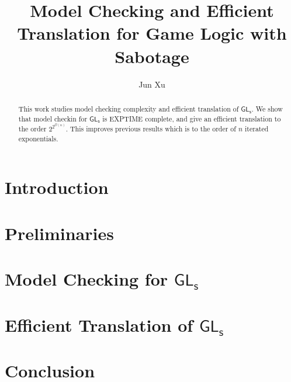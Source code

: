 \documentclass[a4paper,UKenglish,cleveref, autoref, thm-restate]{lipics-v2021}
\title{Model Checking and Efficient Translation for Game Logic with Sabotage} %
\author{Jun {Xu}}{Nanyang Technological University, Singapore}{willxujun@hotmail.com}{https://orcid.org/0000-0002-1825-0097}{This author is supported by an NRF Research Grant}
\newcommand{\GLs}{$\mathsf{GL_s}$}
\begin{document}
\maketitle

\begin{abstract}
This work studies model checking complexity and efficient translation of \GLs{}.
We show that model checkin for \GLs{} is EXPTIME complete,
and give an efficient translation to the order $2^{2^{\mathcal O (n)}}$.
This improves previous results which is to the order of $n$ iterated exponentials.
\end{abstract}

\section{Introduction}

\section{Preliminaries}

\section{Model Checking for \texorpdfstring{\GLs{}}{PDFstring}}

\section{Efficient Translation of \texorpdfstring{\GLs{}}{PDFstring}}

\section{Conclusion}
\end{document}
